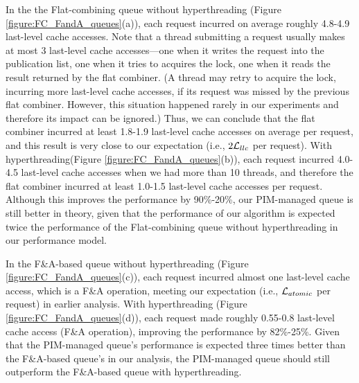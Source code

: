In the the Flat-combining queue without hyperthreading (Figure \ref{figure:FC_FandA_queues}(a)), 
each request incurred on average roughly 4.8-4.9 last-level cache accesses. 
Note that a thread submitting a request usually makes at most 3 last-level cache accesses---one 
when it writes the request into the publication list, one when it tries to acquires the lock, 
one when it reads the result returned by the flat combiner. 
(A thread may retry to acquire the lock, incurring more last-level cache accesses, 
if its request was missed by the previous flat combiner. 
However, this situation happened rarely in our experiments and therefore its impact can be ignored.) 
Thus, we can conclude that the flat combiner incurred at least 1.8-1.9 last-level cache accesses 
on average per request, and this result is very close to our expectation (i.e., $2\mathcal{L}_{llc}$ per request). 
With hyperthreading(Figure \ref{figure:FC_FandA_queues}(b)), 
each request incurred 4.0-4.5 last-level cache accesses when we had more than 10 threads, 
and therefore the flat combiner incurred at least 1.0-1.5 last-level cache accesses per request. 
Although this improves the performance by 90\%-20\%, our PIM-managed queue is still better in theory, 
given that the performance of our algorithm is expected twice the performance of the Flat-combining queue 
without hyperthreading in our performance model. 

In the F\&A-based queue without hyperthreading (Figure \ref{figure:FC_FandA_queues}(c)), 
each request incurred almost one last-level cache access, which is a F\&A operation, 
meeting our expectation (i.e., $\mathcal{L}_{atomic}$ per request) in earlier analysis. 
With hyperthreading (Figure \ref{figure:FC_FandA_queues}(d)), each request made roughly 0.55-0.8 
last-level cache access (F\&A operation), improving the performance by 82\%-25\%.
Given that the PIM-managed queue's performance is expected three times better than the F\&A-based queue's 
in our analysis, the PIM-managed queue should still outperform the F\&A-based queue with hyperthreading. 


